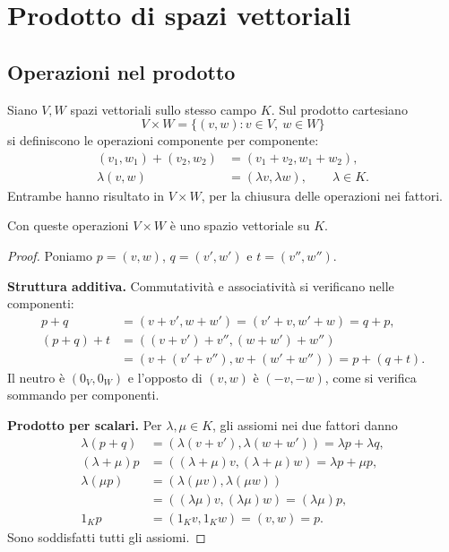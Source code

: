
\section{Prodotto di spazi vettoriali}

\subsection{Operazioni nel prodotto}

Siano $V,W$ spazi vettoriali sullo stesso campo $K$. Sul prodotto cartesiano
\[
  V\times W=\{(v,w):v\in V,\ w\in W\}
\]
si definiscono le operazioni componente per componente:
\begin{align*}
  (v_1,w_1)+(v_2,w_2)&=(v_1+v_2,w_1+w_2),\\
  \lambda(v,w)&=(\lambda v,\lambda w),\qquad\lambda\in K.
\end{align*}
Entrambe hanno risultato in $V\times W$, per la chiusura delle operazioni nei fattori.

\begin{proposizione}
Con queste operazioni $V\times W$ è uno spazio vettoriale su $K$.
\end{proposizione}
\begin{proof}
Poniamo $p=(v,w)$, $q=(v',w')$ e $t=(v'',w'')$.

\textbf{Struttura additiva.} Commutatività e associatività si verificano nelle componenti:
\begin{align*}
  p+q&=(v+v',w+w')=(v'+v,w'+w)=q+p,\\
  (p+q)+t&=((v+v')+v'',(w+w')+w'')\\
    &=(v+(v'+v''),w+(w'+w''))=p+(q+t).
\end{align*}
Il neutro è $(0_V,0_W)$ e l'opposto di $(v,w)$ è $(-v,-w)$, come si verifica sommando per componenti.

\textbf{Prodotto per scalari.} Per $\lambda,\mu\in K$, gli assiomi nei due fattori danno
\begin{align*}
  \lambda(p+q)&=(\lambda(v+v'),\lambda(w+w'))=\lambda p+\lambda q,\\
  (\lambda+\mu)p&=((\lambda+\mu)v,(\lambda+\mu)w)=\lambda p+\mu p,\\
  \lambda(\mu p)&=(\lambda(\mu v),\lambda(\mu w))\\
    &=((\lambda\mu)v,(\lambda\mu)w)=(\lambda\mu)p,\\
  1_Kp&=(1_Kv,1_Kw)=(v,w)=p.
\end{align*}
Sono soddisfatti tutti gli assiomi.
\end{proof}

